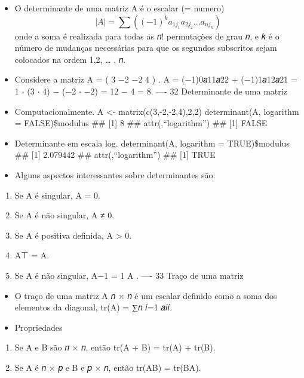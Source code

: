 \documentclass[
]{article}
\providecommand{\tightlist}{%
  \setlength{\itemsep}{0pt}\setlength{\parskip}{0pt}}
\begin{document}
\begin{itemize}
\tightlist
\item
  O determinante de uma matriz A é o escalar (= numero) \[
  |A| = \sum((-1)^k a_{1j_{1}} a_{2j_{2}} ... a_{nj_{n}})
  \] onde a soma é realizada para todas as 𝑛! permutações de grau 𝑛, e 𝑘
  é o número de mudanças necessárias para que os segundos subscritos
  sejam colocados na ordem 1,2, \ldots{} , 𝑛.
\item
  Considere a matriz A = ( 3 −2 −2 4 ) . \textbar A\textbar{} =
  (−1)0𝑎11𝑎22 + (−1)1𝑎12𝑎21 = 1 ⋅ (3 ⋅ 4) − (−2 ⋅ −2) = 12 − 4 = 8. ----
  32 Determinante de uma matriz
\item
  Computacionalmente. A \textless- matrix(c(3,-2,-2,4),2,2)
  determinant(A, logarithm = FALSE)\$modulus \#\# {[}1{]} 8 \#\#
  attr(,``logarithm'') \#\# {[}1{]} FALSE
\item
  Determinante em escala log. determinant(A, logarithm = TRUE)\$modulus
  \#\# {[}1{]} 2.079442 \#\# attr(,``logarithm'') \#\# {[}1{]} TRUE
\item
  Alguns aspectos interessantes sobre determinantes são:
\end{itemize}

\begin{enumerate}
\def\labelenumi{\arabic{enumi}.}
\tightlist
\item
  Se A é singular, \textbar A\textbar{} = 0.
\item
  Se A é não singular, \textbar A\textbar{} ≠ 0.
\item
  Se A é positiva definida, \textbar A\textbar{} \textgreater{} 0.
\item
  \textbar A⊤\textbar{} = \textbar A\textbar.
\item
  Se A é não singular, \textbar A−1\textbar{} = 1 \textbar A\textbar{} .
  ---- 33 Traço de uma matriz
\end{enumerate}

\begin{itemize}
\tightlist
\item
  O traço de uma matriz A 𝑛 × 𝑛 é um escalar definido como a soma dos
  elementos da diagonal, tr(A) = ∑𝑛 𝑖=1 𝑎𝑖𝑖.
\item
  Propriedades
\end{itemize}

\begin{enumerate}
\def\labelenumi{\arabic{enumi}.}
\tightlist
\item
  Se A e B são 𝑛 × 𝑛, então tr(A + B) = tr(A) + tr(B).
\item
  Se A é 𝑛 × 𝑝 e B e 𝑝 × 𝑛, então tr(AB) = tr(BA).
\end{enumerate}
\end{document}
